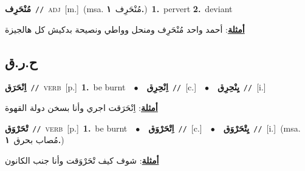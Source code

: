 \documentclass[10pt,a4paper,twoside]{article} %
\begin{document}
\begin{multicols}{2}
{\setlength\topsep{0pt}\textbf{\foreignlanguage{arabic}{مُنْحَرِف}}\ {\color{gray}\texttt{//}\color{black}}\ \textsc{adj}\ [m.]\ \color{gray}(msa. \foreignlanguage{arabic}{مُنْحَرِف}~\foreignlanguage{arabic}{\textbf{١.}})\color{black}\ \textbf{1.}~pervert  \textbf{2.}~deviant\  \begin{flushright}\color{gray}\foreignlanguage{arabic}{\textbf{\underline{\foreignlanguage{arabic}{أمثلة}}}: أحمد واحد مُنْحَرِف ومنحل وواطي ونصيحة بدكيش كل هالجيزة}\end{flushright}\color{black}} \vspace{2mm}

\vspace{-3mm}
\subsection*{\color{blue}\foreignlanguage{arabic}{ح.ر.ق}\color{blue}{}} 

{\setlength\topsep{0pt}\textbf{\foreignlanguage{arabic}{اِنْحَرَق}}\ {\color{gray}\texttt{//}\color{black}}\ \textsc{verb}\ [p.]\ \textbf{1.}~be burnt\ \ $\bullet$\ \ \setlength\topsep{0pt}\textbf{\foreignlanguage{arabic}{اِنْحِرِق}}\ {\color{gray}\texttt{//}\color{black}}\ [c.]\ \ $\bullet$\ \ \setlength\topsep{0pt}\textbf{\foreignlanguage{arabic}{يِنْحِرِق}}\ {\color{gray}\texttt{//}\color{black}}\ [i.]\  \begin{flushright}\color{gray}\foreignlanguage{arabic}{\textbf{\underline{\foreignlanguage{arabic}{أمثلة}}}: اِنْحَرَقت اجري وأنا بسخن دولة القهوة}\end{flushright}\color{black}} \vspace{2mm}

{\setlength\topsep{0pt}\textbf{\foreignlanguage{arabic}{تْحَرْوَق}}\ {\color{gray}\texttt{//}\color{black}}\ \textsc{verb}\ [p.]\ \textbf{1.}~be burnt\ \ $\bullet$\ \ \setlength\topsep{0pt}\textbf{\foreignlanguage{arabic}{اِتْحَرْوَق}}\ {\color{gray}\texttt{//}\color{black}}\ [c.]\ \ $\bullet$\ \ \setlength\topsep{0pt}\textbf{\foreignlanguage{arabic}{يِتْحَرْوَق}}\ {\color{gray}\texttt{//}\color{black}}\ [i.]\ \color{gray}(msa. \foreignlanguage{arabic}{مُصاب بحرق}~\foreignlanguage{arabic}{\textbf{١.}})\color{black}\  \begin{flushright}\color{gray}\foreignlanguage{arabic}{\textbf{\underline{\foreignlanguage{arabic}{أمثلة}}}: شوف كيف تْحَرْوَقت وأنا جنب الكانون}\end{flushright}\color{black}} \vspace{2mm}


\end{multicols}
\end{document}
